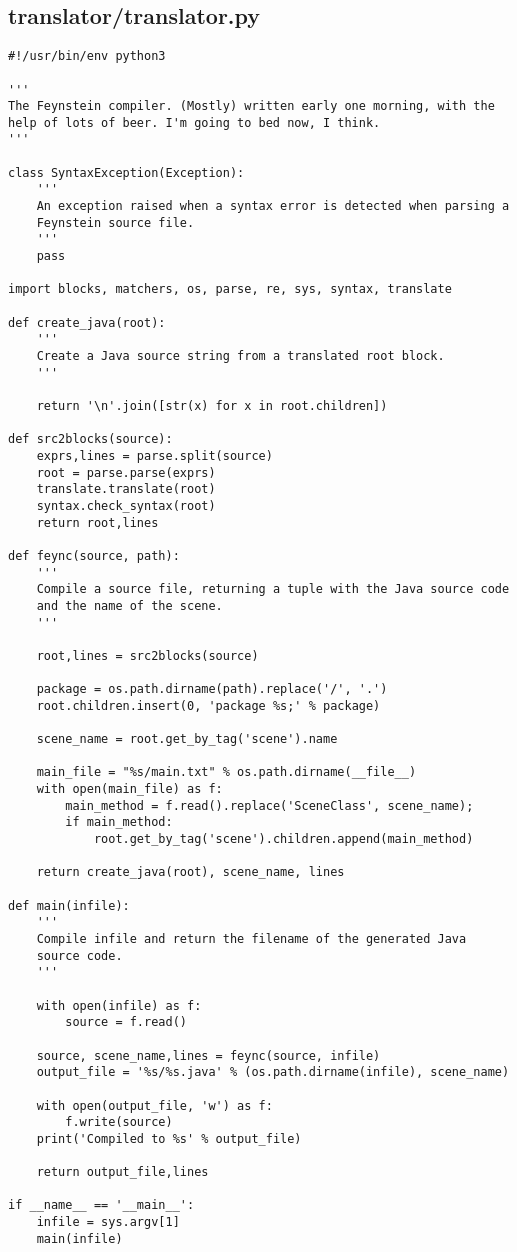 \subsection*{translator/translator.py}
\begin{lstlisting}
#!/usr/bin/env python3

'''
The Feynstein compiler. (Mostly) written early one morning, with the
help of lots of beer. I'm going to bed now, I think.
'''

class SyntaxException(Exception): 
    '''
    An exception raised when a syntax error is detected when parsing a
    Feynstein source file.
    '''
    pass

import blocks, matchers, os, parse, re, sys, syntax, translate

def create_java(root):
    '''
    Create a Java source string from a translated root block.
    '''

    return '\n'.join([str(x) for x in root.children])

def src2blocks(source):
    exprs,lines = parse.split(source)
    root = parse.parse(exprs)
    translate.translate(root)
    syntax.check_syntax(root)
    return root,lines

def feync(source, path):
    '''
    Compile a source file, returning a tuple with the Java source code
    and the name of the scene.
    '''

    root,lines = src2blocks(source)

    package = os.path.dirname(path).replace('/', '.')
    root.children.insert(0, 'package %s;' % package)

    scene_name = root.get_by_tag('scene').name

    main_file = "%s/main.txt" % os.path.dirname(__file__)
    with open(main_file) as f:
        main_method = f.read().replace('SceneClass', scene_name);
        if main_method:
            root.get_by_tag('scene').children.append(main_method)

    return create_java(root), scene_name, lines

def main(infile):
    '''
    Compile infile and return the filename of the generated Java
    source code.
    '''

    with open(infile) as f:
        source = f.read()

    source, scene_name,lines = feync(source, infile)
    output_file = '%s/%s.java' % (os.path.dirname(infile), scene_name)

    with open(output_file, 'w') as f:
        f.write(source)
    print('Compiled to %s' % output_file)
    
    return output_file,lines

if __name__ == '__main__':
    infile = sys.argv[1]
    main(infile)
\end{lstlisting}


